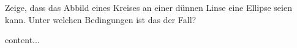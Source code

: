 \flushleft
\noindent
\begin{minipage}[b]{0.3\textwidth}
	\begin{Exercise}[label = elllens, title = Bild eines Kreises, difficulty = 4, origin = Aaron Wild]
		Zeige, dass das Abbild eines Kreises an einer dünnen Linse eine Ellipse seien kann. Unter welchen Bedingungen ist das der Fall? 
	\end{Exercise}
\end{minipage}
\hfill
\begin{minipage}[b]{0.6\textwidth}
	\centering

\end{minipage}
\begin{Answer}[ref = elllens]
	content...
\end{Answer}
